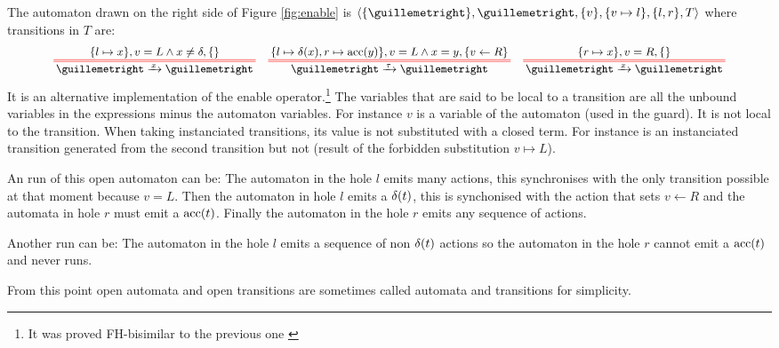 \documentclass{article}
\begin{document}
\begin{exi}
The automaton drawn on the right side of Figure \ref{fig:enable} is \(\OA{\mbrc{»}}{»}{\mbrc{v}}{\mbrc{v \mapsto l}}{\mbrc{l, r}}{T}\) where transitions in \(T\) are:
\begin{align*}
	\OT{»}{»}{x}{\mbrc{l \mapsto x}}{v = L \wedge x \neq \delta}{\mbrc{}} &&
	\OT{»}{»}{\tau}{\mbrc{l \mapsto \delta\mpar{x}, r \mapsto \act{acc}\mpar{y}}}{v = L \wedge x = y}{\mbrc{v \gets R}} &&
	\OT{»}{»}{x}{\mbrc{r \mapsto x}}{v = R}{\mbrc{}}
\end{align*}
It is an alternative implementation of the enable operator.\footnote{It was proved FH-bisimilar to the previous one \cite{henrio:01299562}}
The variables that are said to be local to a transition are all the unbound variables in the expressions minus the automaton variables.
For instance \(v\) is a variable of the automaton (used in the guard).
It is not local to the transition.
When taking instanciated transitions, its value is not substituted with a closed term.
For instance  is an instanciated transition generated from the second transition but not  (result of the forbidden substitution \(v \mapsto L\)).

An run of this open automaton can be: The automaton in the hole \(l\) emits many actions, this synchronises with the only transition possible at that moment because \(v = L\).
Then the automaton in hole \(l\) emits a \(\delta{\left(t\right)}\), this is synchonised with the action that sets \(v \gets R\) and the automata in hole \(r\) must emit a \(\mathrm{acc}{\left(t\right)}\).
Finally the automaton in the hole \(r\) emits any sequence of actions.

Another run can be: The automaton in the hole \(l\) emits a sequence of non \(\delta{\left(t\right)}\) actions so the automaton in the hole \(r\) cannot emit a \(\mathrm{acc}{\left(t\right)}\) and never runs.
\end{exi}
From this point open automata and open transitions are sometimes called automata and transitions for simplicity. %
\end{document}
